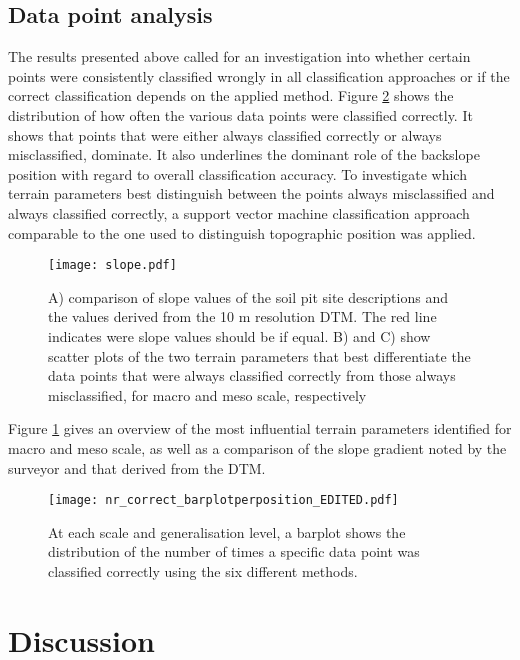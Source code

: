\documentclass[preprint,12pt,authoryear]{elsarticle}
\begin{document}
\subsection{Data point analysis} 
The results presented above called for an investigation into whether certain points were consistently classified wrongly in all classification approaches or if the correct classification depends on the applied method. Figure \ref{fig:hist_correct_per_tp} shows the distribution of how often the various data points were classified correctly. It shows that points that were either always classified correctly or always misclassified, dominate. It also underlines the dominant role of the backslope position with regard to overall classification accuracy. To investigate which terrain parameters best distinguish between the points always misclassified and always classified correctly, a support vector machine classification approach comparable to the one used to distinguish topographic position was applied.
\begin{figure}
\texttt{[image: slope.pdf]}
\caption{A) comparison of slope values of the soil pit site descriptions and the  values derived from the 10 m resolution DTM. The red line indicates were slope values should be if equal. B) and C) show scatter plots of the two terrain parameters that best differentiate the data points that were always classified correctly from those always misclassified, for macro and meso scale, respectively}
\label{fig:slope}
\end{figure}
 Figure \ref{fig:slope} gives an overview of the most influential terrain parameters identified for macro and meso scale, as well as a comparison of the slope gradient noted by the surveyor and that derived from the DTM. 

\begin{figure}
\texttt{[image: nr\_correct\_barplotperposition\_EDITED.pdf]}
\caption{At each scale and generalisation level, a barplot shows the distribution of the number of times a specific data point was classified correctly using the six different methods.}
\label{fig:hist_correct_per_tp}
\end{figure}


\section{Discussion}
\end{document}
